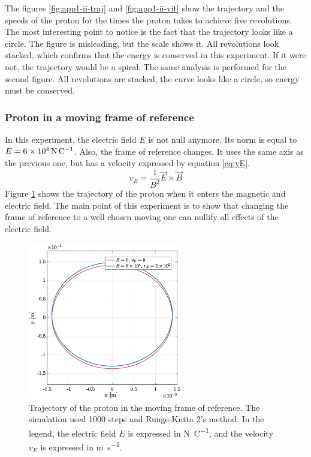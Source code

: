 \documentclass[a4paper,12pt,twoside]{article}
\begin{document}
The figures \ref{fig:app1-ii-traj} and \ref{fig:app1-ii-vit} show the trajectory and the speeds of the proton for the times the proton takes to achieve five revolutions.
The most interesting point to notice is the fact that the trajectory looks like a circle.
The figure is misleading, but the scale shows it.
All revolutions look stacked, which confirms that the energy is conserved in this experiment.
If it were not, the trajectory would be a spiral.
The same analysis is performed for the second figure.
All revolutions are stacked, the curve looks like a circle, so energy must be conserved.\\

\subsubsection{Proton in a moving frame of reference}
In this experiment, the electric field $E$ is not null anymore.
Its norm is equal to $E=\SI{6d4}{\newton\per\coulomb}$.
Also, the frame of reference changes.
It uses the same axis as the previous one, but has a velocity expressed by equation \ref{eq:vE}.
\begin{equation}
	v_E = \frac{1}{B^2}\vec{E}\times\vec{B}
	\label{eq:vE}
\end{equation}%
Figure \ref{fig:app1_iii_traj} shows the trajectory of the proton when it enters the magnetic and electric field.
The main point of this experiment is to show that changing the frame of reference to a well chosen moving one can nullify all effects of the electric field.
\begin{figure}[h]
\centering
	\includegraphics[width=0.6\textwidth]{graphs/app1_iii_traj.eps}
	\caption{Trajectory of the proton in the moving frame of reference. The simulation used \num{1000} steps and Runge-Kutta 2's method. In the legend, the electric field $E$ is expressed in \si{\newton\per\coulomb}, and the velocity $v_E$ is expressed in \si{\meter\per\second}.}
	\label{fig:app1_iii_traj}
\end{figure}
\end{document}
